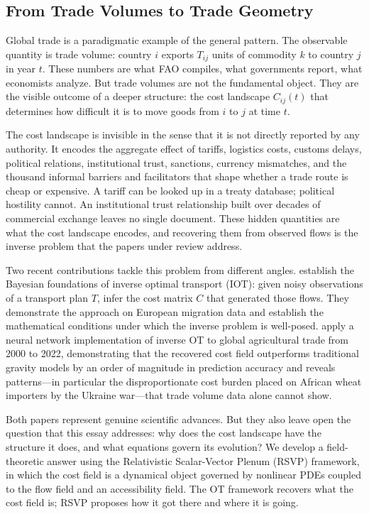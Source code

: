 \documentclass[12pt]{article}
\begin{document}
\subsection{From Trade Volumes to Trade Geometry}

Global trade is a paradigmatic example of the general pattern. The observable quantity is trade volume: country $i$ exports $T_{ij}$ units of commodity $k$ to country $j$ in year $t$. These numbers are what FAO compiles, what governments report, what economists analyze. But trade volumes are not the fundamental object. They are the visible outcome of a deeper structure: the cost landscape $C_{ij}(t)$ that determines how difficult it is to move goods from $i$ to $j$ at time $t$.

The cost landscape is invisible in the sense that it is not directly reported by any authority. It encodes the aggregate effect of tariffs, logistics costs, customs delays, political relations, institutional trust, sanctions, currency mismatches, and the thousand informal barriers and facilitators that shape whether a trade route is cheap or expensive. A tariff can be looked up in a treaty database; political hostility cannot. An institutional trust relationship built over decades of commercial exchange leaves no single document. These hidden quantities are what the cost landscape encodes, and recovering them from observed flows is the inverse problem that the papers under review address.

Two recent contributions tackle this problem from different angles. \citet{stuart2019} establish the Bayesian foundations of inverse optimal transport (IOT): given noisy observations of a transport plan $T$, infer the cost matrix $C$ that generated those flows. They demonstrate the approach on European migration data and establish the mathematical conditions under which the inverse problem is well-posed. \citet{gaskin2026} apply a neural network implementation of inverse OT to global agricultural trade from 2000 to 2022, demonstrating that the recovered cost field outperforms traditional gravity models by an order of magnitude in prediction accuracy and reveals patterns---in particular the disproportionate cost burden placed on African wheat importers by the Ukraine war---that trade volume data alone cannot show.

Both papers represent genuine scientific advances. But they also leave open the question that this essay addresses: why does the cost landscape have the structure it does, and what equations govern its evolution? We develop a field-theoretic answer using the Relativistic Scalar-Vector Plenum (RSVP) framework, in which the cost field is a dynamical object governed by nonlinear PDEs coupled to the flow field and an accessibility field. The OT framework recovers what the cost field is; RSVP proposes how it got there and where it is going.
\end{document}
